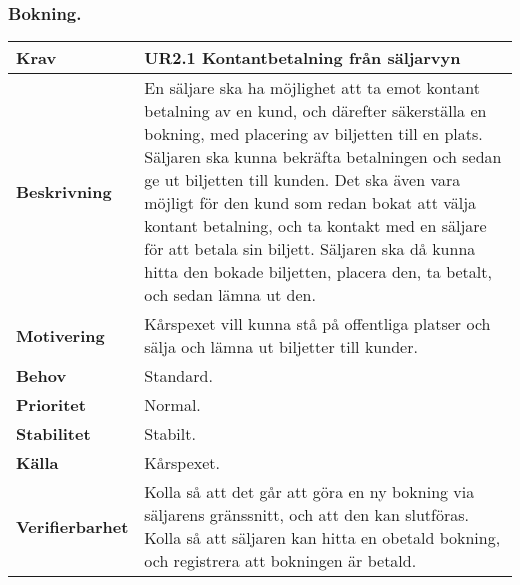 \documentclass[a4paper, twoside, 11pt, titlepage]{article}
\begin{document}
		\subsubsection{Bokning.}


		\begin {table} [ht] \begin{tabular} { p{2.6cm} p{12.5cm} }
			\hline
			{\sffamily\textbf{Krav}} & {\sffamily\textbf{UR2.1 Kontantbetalning från säljarvyn }} \\
			\hline
			{\sffamily\textbf{Beskrivning}} & {En säljare ska ha möjlighet att ta emot kontant betalning av en kund, och därefter säkerställa en bokning, med placering av biljetten till en plats. Säljaren ska kunna bekräfta betalningen och sedan ge ut biljetten till kunden. Det ska även vara möjligt för den kund som redan bokat att välja kontant betalning, och ta kontakt med en säljare för att betala sin biljett. Säljaren ska då kunna hitta den bokade biljetten, placera den, ta betalt, och sedan lämna ut den.} \\
			\hline
			{\sffamily\textbf{Motivering}} & {Kårspexet vill kunna stå på offentliga platser och sälja och lämna ut biljetter till kunder.} \\
			\hline
			{\sffamily\textbf{Behov}} & {Standard.} \\
			\hline
			{\sffamily\textbf{Prioritet}} & {Normal.} \\
			\hline
			{\sffamily\textbf{Stabilitet}} & {Stabilt.} \\
			\hline
			{\sffamily\textbf{Källa}} & {Kårspexet.} \\
			\hline
			{\sffamily\textbf{Verifierbarhet}} & {Kolla så att det går att göra en ny bokning via säljarens gränssnitt, och att den kan slutföras. Kolla så att säljaren kan hitta en obetald bokning, och registrera att bokningen är betald.} \\
			\hline
		\end{tabular} \end{table} \FloatBarrier
		\vspace{6mm}
\end{document}

